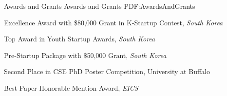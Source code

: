 \documentclass[letterpaper,MMMyyyy,nonstopmode]{simpleresumecv}
\begin{document}
\begin{Body}







\vspace{1ex}
\Section
{Awards and\newline
Grants}
{Awards and Grants}
{PDF:AwardsAndGrants}

\BulletItem
Excellence Award with \$80,000 Grant in K-Startup Contest, \textit{South Korea}
\hfill
{}
\vspace{0.5ex}

\BulletItem
Top Award in Youth Startup Awards, \textit{South Korea}
\hfill
{}
\vspace{0.5ex}

\BulletItem
Pre-Startup Package with \$50,000 Grant, \textit{South Korea} 
\hfill
{}
\vspace{0.5ex}

\BulletItem
Second Place in CSE PhD Poster Competition, University at Buffalo
\hfill
{}
\vspace{0.5ex}


\BulletItem
Best Paper Honorable Mention Award, \textit{EICS}
\hfill
{}
\vspace{0.5ex}


\end{Body}
\end{document}
